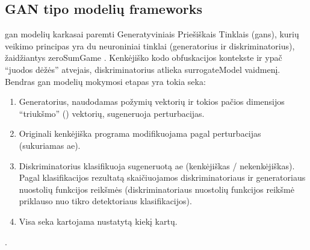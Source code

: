 \subsection{GAN tipo modelių \glspl{framework}}\label{sec:literature:gan}

\acs{gan} modelių karkasai paremti Generatyviniais Priešiškais Tinklais (\aclp{gan}), kurių veikimo principas yra du neuroniniai tinklai (generatorius ir diskriminatorius), žaidžiantys \gls{zeroSumGame} \cite{chenInfoGANInterpretableRepresentation2016a}. Kenkėjiško kodo obfuskacijos kontekste ir ypač \enquote{juodos dėžės} atvejais, diskriminatorius atlieka \gls{surrogateModel} vaidmenį. Bendras \ac{gan} modelių mokymosi etapas yra tokia seka:
\begin{enumerate}
    \item Generatorius, naudodamas požymių vektorių ir tokios pačios dimensijos
          \enquote{triukšmo} () vektorių, sugeneruoja perturbacijas.
    \item Originali kenkėjiška programa modifikuojama pagal perturbacijas (sukuriamas
          \ac{ae}).
    \item Diskriminatorius klasifikuoja sugeneruotą \ac{ae} (kenkėjiškas /
          nekenkėjiškas). Pagal klasifikacijos rezultatą skaičiuojamos diskriminatoriaus ir generatoriaus nuostolių funkcijos reikšmės (diskriminatoriaus nuostolių funkcijos reikšmė priklauso nuo tikro detektoriaus klasifikacijos).
    \item Visa seka kartojama nustatytą kiekį kartų.
\end{enumerate} \cite{huGeneratingAdversarialMalware2017,zhuNgramMalGANEvading2022,zhongMalFoxCamouflagedAdversarial2024}.

